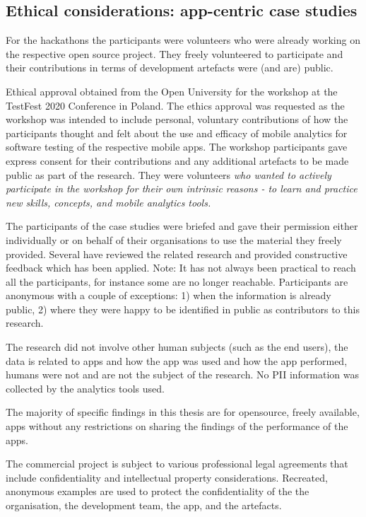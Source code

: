 \subsection{Ethical considerations: app-centric case studies}
For the hackathons the participants were volunteers who were already working on the respective open source project. They freely volunteered to participate and their contributions in terms of development artefacts were (and are) public. 

Ethical approval obtained from the Open University for the workshop at the TestFest 2020 Conference in Poland. The ethics approval was requested as the workshop was intended to include personal, voluntary contributions of how the participants thought and felt about the use and efficacy of mobile analytics for software testing of the respective mobile apps. The workshop participants gave express consent for their contributions and any additional artefacts to be made public as part of the research. They were volunteers \textit{who wanted to actively participate in the workshop for their own intrinsic reasons - to learn and practice new skills, concepts, and mobile analytics tools.}

The participants of the case studies were briefed and gave their permission either individually or on behalf of their organisations to use the material they freely provided. Several have reviewed the related research and provided constructive feedback which has been applied. 
Note: It has not always been practical to reach all the participants, for instance some are no longer reachable.
%
Participants are anonymous with a couple of exceptions: 1) when the information is already public, 2) where they were happy to be identified in public as contributors to this research.  

The research did not involve other human subjects (such as the end users), the data is related to apps and how the app was used and how the app performed, humans were not and are not the subject of the research. No PII information was collected by the analytics tools used.

The majority of specific findings in this thesis are for opensource, freely available, apps without any restrictions on sharing the findings of the performance of the apps. 

The commercial project is subject to various professional legal agreements that include confidentiality and intellectual property considerations. Recreated, anonymous examples are used to protect the confidentiality of the the organisation, the development team, the app, and the artefacts.

